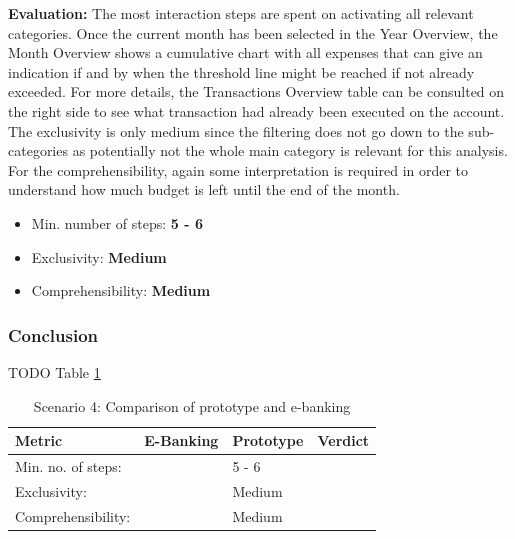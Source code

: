 \textbf{Evaluation:} The most interaction steps are spent on activating all relevant categories. Once the current month has been selected in the Year Overview, the Month Overview shows a cumulative chart with all expenses that can give an indication if and by when the threshold line might be reached if not already exceeded. For more details, the Transactions Overview table can be consulted on the right side to see what transaction had already been executed on the account. The exclusivity is only medium since the filtering does not go down to the sub-categories as potentially not the whole main category is relevant for this analysis. For the comprehensibility, again some interpretation is required in order to understand how much budget is left until the end of the month.
\begin{itemize}[noitemsep,nolistsep]
	\item Min. number of steps: \textbf{5 - 6}
	\item Exclusivity: \textbf{Medium}
	\item Comprehensibility: \textbf{Medium}
\end{itemize}



\subsubsection{Conclusion}

TODO Table \ref{tbl:scenariofourcomparison}

\begin{table}[t]
	\begin{center}
		\begin{tabular}{ | p{3.2cm} | p{3.8cm} | p{3.5cm} | p{2.5cm} | }
			\hline
			\textbf{Metric} & \textbf{E-Banking} & \textbf{Prototype} & \textbf{Verdict} \\
			\hline
			Min. no. of steps: &  & 5 - 6 &  \\
			\hline
			Exclusivity: &  & Medium &  \\
			\hline
			Comprehensibility: &  & Medium &  \\
			\hline
		\end{tabular}
		\caption{Scenario 4: Comparison of prototype and e-banking}
		\label{tbl:scenariofourcomparison}
	\end{center}
\end{table}



